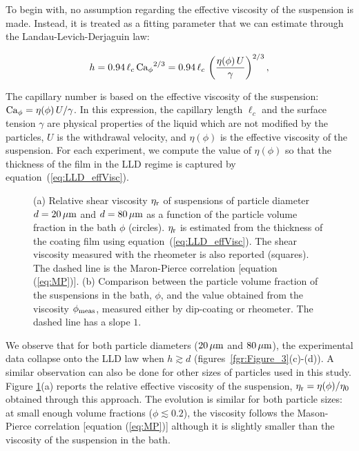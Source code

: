 \documentclass{jfm}
\begin{document}
To begin with, no assumption regarding the effective viscosity of the suspension is made. Instead, it is treated as a fitting parameter that we can estimate through the Landau-Levich-Derjaguin law:

\begin{equation}
    h=0.94\,\ell_c\,{{\rm Ca}_\phi}^{2/3}=0.94\,\ell_c\,\left(\frac{\eta(\phi)\,U}{\gamma}\right)^{2/3},
    \label{eq:LLD_effVisc}
\end{equation}

The capillary number is based on the effective viscosity of the suspension: ${\rm Ca}_\phi=\eta(\phi)\,U/\gamma$. In this expression, the capillary length $\ell_c$ and the surface tension $\gamma$ are physical properties of the liquid which are not modified by the particles, $U$ is the withdrawal velocity, and $\eta(\phi)$ is the effective viscosity of the suspension. For each experiment, we compute the value of $\eta(\phi)$ so that the thickness of the film in the LLD regime is captured by equation~(\ref{eq:LLD_effVisc}).

\begin{figure}
    \centering
    \caption{(a) Relative shear viscosity $\eta_{\rm r}$ of suspensions of particle diameter
        $d = 20\,\mu{\rm m}$ and $d = 80\,\mu{\rm m}$ as a function of the particle volume fraction in the bath $\phi$ (circles). $\eta_{\rm r}$ is estimated from the thickness of the coating film using equation~(\ref{eq:LLD_effVisc}). The shear viscosity measured with the rheometer is also reported (squares). The dashed line is the Maron-Pierce correlation [equation (\ref{eq:MP})]. (b) Comparison between the particle volume fraction of the suspensions in the bath, $\phi$, and the value obtained from the viscosity $\phi_{\rm meas}$, measured either by dip-coating or rheometer. The dashed line has a slope $1$.}
    \label{fig:Figure_4}
\end{figure}

We observe that for both particle diameters ($20\,\mu{\rm m}$ and $80\,\mu{\rm m}$), the experimental data collapse onto the LLD law when $h\gtrsim d$ (figures~\ref{fgr:Figure_3}(c)-(d)). A similar observation can also be done for other sizes of particles used in this study. Figure \ref{fig:Figure_4}(a) reports the relative effective viscosity of the suspension, $\eta_{\rm r}=\eta(\phi)/\eta_0$ obtained through this approach. The evolution is similar for both particle sizes: at small enough volume fractions  ($\phi \lesssim 0.2$), the viscosity follows the Mason-Pierce correlation [equation (\ref{eq:MP})] although it is slightly smaller than the viscosity of the suspension in the bath. 
\end{document}
